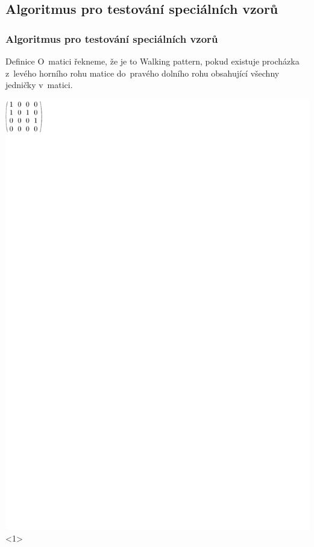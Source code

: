 \documentclass{beamer}
\begin{document}
\subsection{Algoritmus pro testování speciálních vzorů}
\begin{frame}
\frametitle{Algoritmus pro testování speciálních vzorů}
\begin{block}{Definice}
O~matici řekneme, že je to Walking pattern, pokud existuje procházka z~levého horního rohu matice do~pravého dolního rohu obsahující všechny jedničky v~matici.
\end{block}
\vspace{5mm}
\centering
\includegraphics{../img/walkingexample1.pdf}<1>

\end{frame}
\end{document}
